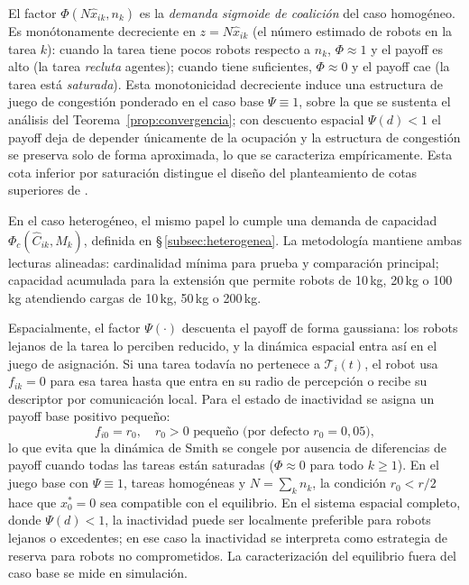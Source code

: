 El factor $\Phi(N\hat{x}_{ik}, n_k)$ es la \emph{demanda sigmoide de coalición} del
caso homogéneo.
Es monótonamente decreciente en $z = N\hat{x}_{ik}$ (el número estimado de
robots en la tarea $k$): cuando la tarea tiene pocos robots respecto a $n_k$,
$\Phi \approx 1$ y el payoff es alto (la tarea \emph{recluta} ag\-entes);
cuando tiene suficientes, $\Phi \approx 0$ y el payoff cae (la tarea está
\emph{saturada}). Esta monotonicidad decreciente induce una estructura de juego de
congestión ponderado en el caso base $\Psi\equiv1$, sobre la que se sustenta el
análisis del Teorema~\ref{prop:convergencia}; con descuento espacial $\Psi(d)<1$ el
payoff deja de depender únicamente de la ocupación y la estructura de congestión se
preserva solo de forma aproximada, lo que se caracteriza empíricamente. Esta cota
inferior por saturación distingue el diseño del planteamiento de cotas superiores de
\citet{martinezpiazuelo2022automatica}.

En el caso heterogéneo, el mismo papel lo cumple una demanda de capacidad
$\Phi_c(\hat{C}_{ik},M_k)$, definida en \S\,\ref{subsec:heterogenea}. La metodología
mantiene ambas lecturas alineadas: cardinalidad mínima para prueba y comparación
principal; capacidad acumulada para la extensión que permite robots de 10\,kg, 20\,kg o
100\,kg atendiendo cargas de 10\,kg, 50\,kg o 200\,kg.

Espacialmente, el factor $\Psi(\cdot)$ descuenta el payoff de forma gaussiana: los
robots lejanos de la tarea lo perciben reducido, y la dinámica espacial entra así en el
juego de asignación. Si una tarea todavía no pertenece a $\mathcal{T}_i(t)$, el robot
usa $f_{ik}=0$ para esa tarea hasta que entra en su radio de percepción o recibe su
descriptor por comunicación local. Para el estado de inactividad se asigna un payoff base
positivo pequeño:
\begin{equation}
  f_{i0} = r_0, \quad r_0 > 0 \text{ pequeño (por defecto } r_0 = 0{,}05),
  \label{eq:payoff_idle}
\end{equation}
lo que evita que la dinámica de Smith se congele por ausencia de diferencias de
payoff cuando todas las tareas están saturadas ($\Phi \approx 0$ para todo $k \geq 1$).
En el juego base con $\Psi \equiv 1$, tareas homogéneas y $N = \sum_k n_k$, la
condición $r_0 < r/2$ hace que $x_0^* = 0$ sea compatible con el equilibrio. En el
sistema espacial completo, donde $\Psi(d) < 1$, la inactividad puede ser localmente
preferible para robots lejanos o excedentes; en ese caso la inactividad se interpreta
como estrategia de reserva para robots no comprometidos. La caracterización del
equilibrio fuera del caso base se mide en simulación.

